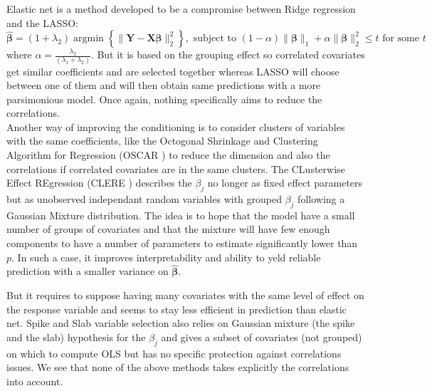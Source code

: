 \documentclass[11pt,a4paper]{article}
\begin{document}
	Elastic net \cite{zou2005regularization}	is a method developed to be a compromise between Ridge regression and the \textsc{LASSO}: 
	\begin{equation}
		\boldsymbol{\hat{\beta}}=(1+\lambda_2) \operatorname{argmin}\left\lbrace \parallel \boldsymbol{Y}-\boldsymbol{X\beta} \parallel_2^2 \right\rbrace, \textrm{ subject to } (1-\alpha)\parallel\boldsymbol{\beta}\parallel_1+\alpha\parallel\boldsymbol{\beta}\parallel_2^2\leq t \textrm{ for some } t
	\end{equation}
	where $\alpha=\frac{\lambda_2}{(\lambda_1+\lambda_2)}$. 
	But it is based on the grouping effect so correlated covariates get similar coefficients and are selected together whereas LASSO will choose between one of them and will then obtain same predictions with a more parsimonious model. Once again, nothing specifically aims to reduce the correlations. %
	\\
	
	Another way of improving the conditioning is to consider clusters of variables with the same coefficients, like the Octogonal Shrinkage and Clustering Algorithm for Regression (\textsc{OSCAR} \cite{bondell2008simultaneous}) to reduce the dimension and also the correlations if correlated covariates are in the same clusters.
	The CLusterwise Effect REgression (\textsc{CLERE} \cite{yengo2012variable}) describes the $\beta_j$ no longer as fixed effect parameters but as unobserved independant random variables with grouped $\beta_j$ following a Gaussian Mixture distribution. The idea is to hope that the model have a small number of groups of covariates and that the mixture will have few enough components to have a number of parameters to estimate significantly lower than $p$. In such a case, it improves interpretability and ability to yeld reliable prediction with a smaller variance on $\boldsymbol{\hat{\beta}}$. 
	
	But it requires to suppose having many covariates with the same level of effect on the response variable and seems to stay less efficient in prediction than elastic net. Spike and Slab variable selection \cite{ishwaran2005spike} also relies on Gaussian mixture (the spike and the slab) hypothesis for the $\beta_j$ and gives a subset of covariates (not grouped) on which to compute \textsc{OLS} but has no specific protection against correlations issues.
	We see that none of the above methods takes explicitly the correlations into account.
\end{document}
